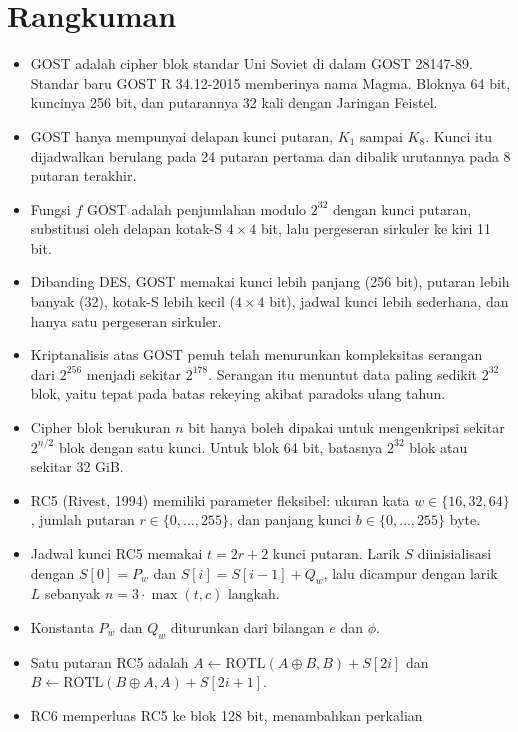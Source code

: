 \section{Rangkuman}
\begin{itemize}
    \item GOST adalah cipher blok standar Uni Soviet di dalam GOST 28147-89.
    Standar baru GOST R 34.12-2015 memberinya nama Magma. Bloknya 64 bit,
    kuncinya 256 bit, dan putarannya 32 kali dengan Jaringan Feistel.
    \item GOST hanya mempunyai delapan kunci putaran, $K_1$ sampai $K_8$.
    Kunci itu dijadwalkan berulang pada 24 putaran pertama dan dibalik urutannya
    pada 8 putaran terakhir.
    \item Fungsi $f$ GOST adalah penjumlahan modulo $2^{32}$ dengan kunci putaran,
    substitusi oleh delapan kotak-S $4 \times 4$ bit, lalu pergeseran sirkuler
    ke kiri 11 bit.
    \item Dibanding DES, GOST memakai kunci lebih panjang (256 bit), putaran
    lebih banyak (32), kotak-S lebih kecil ($4 \times 4$ bit), jadwal kunci lebih
    sederhana, dan hanya satu pergeseran sirkuler.
    \item Kriptanalisis atas GOST penuh telah menurunkan kompleksitas serangan
    dari $2^{256}$ menjadi sekitar $2^{178}$. Serangan itu menuntut data paling
    sedikit $2^{32}$ blok, yaitu tepat pada batas rekeying akibat paradoks ulang
    tahun.
    \item Cipher blok berukuran $n$ bit hanya boleh dipakai untuk mengenkripsi
    sekitar $2^{n/2}$ blok dengan satu kunci. Untuk blok 64 bit, batasnya
    $2^{32}$ blok atau sekitar 32 GiB.
    \item RC5 (Rivest, 1994) memiliki parameter fleksibel: ukuran kata
    $w \in \{16,32,64\}$, jumlah putaran $r \in \{0,\dots,255\}$, dan panjang
    kunci $b \in \{0,\dots,255\}$ byte.
    \item Jadwal kunci RC5 memakai $t = 2r+2$ kunci putaran. Larik $S$
    diinisialisasi dengan $S[0]=P_w$ dan $S[i]=S[i-1]+Q_w$, lalu dicampur dengan
    larik $L$ sebanyak $n = 3 \cdot \max(t,c)$ langkah.
    \item Konstanta $P_w$ dan $Q_w$ diturunkan dari bilangan $e$ dan $\phi$.
    \item Satu putaran RC5 adalah $A \leftarrow \mathrm{ROTL}(A \oplus B, B) +
    S[2i]$ dan $B \leftarrow \mathrm{ROTL}(B \oplus A, A) + S[2i+1]$.
    \item RC6 memperluas RC5 ke blok 128 bit, menambahkan perkalian

\end{itemize}
